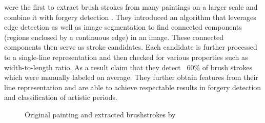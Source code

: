 \citeauthor*{rhythmic} were the first to extract brush strokes from many paintings on a larger scale and combine it with forgery detection \cite{rhythmic}.
They introduced an algorithm that leverages edge detection as well as image segmentation to find connected components (regions enclosed by a continuous edge) in an image.
These connected components then serve as stroke candidates.
Each candidate is further processed to a single-line representation and then checked for various properties such as width-to-length ratio.
As a result \citeauthor*{rhythmic} claim that they detect ~60\% of brush strokes which were manually labeled on average.
They further obtain features from their line representation and are able to achieve respectable results in forgery detection and classification of artistic periods.
\begin{figure}
    \qquad
    \caption{Original painting and extracted brushstrokes by \citeauthor*{rhythmic}}
\end{figure}

